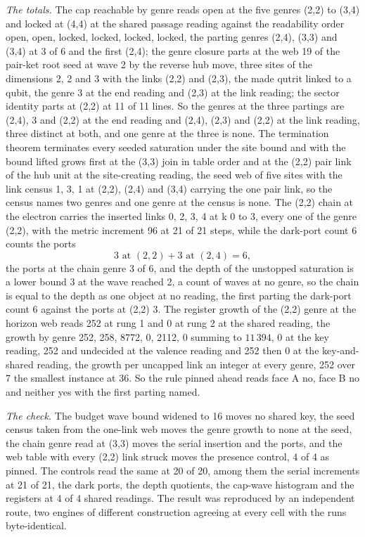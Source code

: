 \begin{chproof}
\textit{The totals.} The cap reachable by genre reads open at the five genres (2,2) to (3,4) and locked at (4,4) at the shared passage reading against the readability order open, open, locked, locked, locked, locked, the parting genres (2,4), (3,3) and (3,4) at 3 of 6 and the first (2,4); the genre closure parts at the web 19 of the pair-ket root seed at wave 2 by the reverse hub move, three sites of the dimensions 2, 2 and 3 with the links (2,2) and (2,3), the made qutrit linked to a qubit, the genre 3 at the end reading and (2,3) at the link reading; the sector identity parts at (2,2) at 11 of 11 lines. So the genres at the three partings are (2,4), 3 and (2,2) at the end reading and (2,4), (2,3) and (2,2) at the link reading, three distinct at both, and one genre at the three is none. The termination theorem terminates every seeded saturation under the site bound and with the bound lifted grows first at the (3,3) join in table order and at the (2,2) pair link of the hub unit at the site-creating reading, the seed web of five sites with the link census 1, 3, 1 at (2,2), (2,4) and (3,4) carrying the one pair link, so the census names two genres and one genre at the census is none. The (2,2) chain at the electron carries the inserted links 0, 2, 3, 4 at k 0 to 3, every one of the genre (2,2), with the metric increment 96 at 21 of 21 steps, while the dark-port count 6 counts the ports
\begin{equation}
3 \text{ at } (2,2) + 3 \text{ at } (2,4) = 6,
\end{equation}
the ports at the chain genre 3 of 6, and the depth of the unstopped saturation is a lower bound 3 at the wave reached 2, a count of waves at no genre, so the chain is equal to the depth as one object at no reading, the first parting the dark-port count 6 against the ports at (2,2) 3. The register growth of the (2,2) genre at the horizon web reads 252 at rung 1 and 0 at rung 2 at the shared reading, the growth by genre 252, 258, 8772, 0, 2112, 0 summing to $11\,394$, 0 at the key reading, 252 and undecided at the valence reading and 252 then 0 at the key-and-shared reading, the growth per uncapped link an integer at every genre, 252 over 7 the smallest instance at 36. So the rule pinned ahead reads face A no, face B no and neither yes with the first parting named.

\textit{The check.} The budget wave bound widened to 16 moves no shared key, the seed census taken from the one-link web moves the genre growth to none at the seed, the chain genre read at (3,3) moves the serial insertion and the ports, and the web table with every (2,2) link struck moves the presence control, 4 of 4 as pinned. The controls read the same at 20 of 20, among them the serial increments at 21 of 21, the dark ports, the depth quotients, the cap-wave histogram and the registers at 4 of 4 shared readings. The result was reproduced by an independent route, two engines of different construction agreeing at every cell with the runs byte-identical.
\end{chproof}
